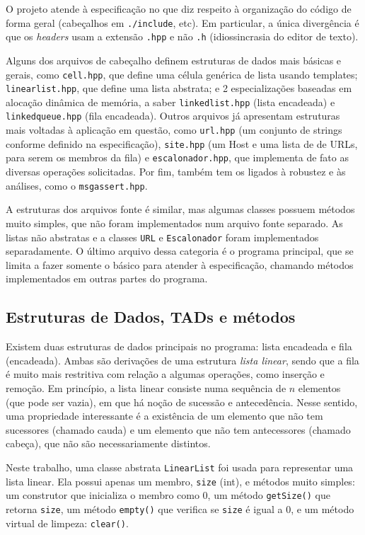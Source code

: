 \documentclass{article}
\def\code#1{\texttt{#1}}
\begin{document}
O projeto atende à especificação no que diz respeito à organização do código de forma geral (cabeçalhos em \code{./include}, etc). Em particular, a única divergência é que os \emph{headers} usam a extensão \code{.hpp} e não \code{.h} (idiossincrasia do editor de texto).

Alguns dos arquivos de cabeçalho definem estruturas de dados mais básicas e gerais, como \code{cell.hpp}, que define uma célula genérica de lista usando templates; \code{linearlist.hpp}, que define uma lista abstrata; e 2 especializações baseadas em alocação dinâmica de memória, a saber \code{linkedlist.hpp} (lista encadeada) e \code{linkedqueue.hpp} (fila encadeada). Outros arquivos já apresentam estruturas mais voltadas à aplicação em questão, como \code{url.hpp} (um conjunto de strings conforme definido na especificação), \code{site.hpp} (um Host e uma lista de de URLs, para serem os membros da fila) e \code{escalonador.hpp}, que implementa de fato as diversas operações solicitadas. Por fim, também tem os ligados à robustez e às análises, como o \code{msgassert.hpp}.

A estruturas dos arquivos fonte é similar, mas algumas classes possuem métodos muito simples, que não foram implementados num arquivo fonte separado. As listas não abstratas e a classes \code{URL}  e \code{Escalonador} foram implementados separadamente. O último arquivo dessa categoria é o programa principal, que se limita a fazer somente o básico para atender à especificação, chamando métodos implementados em outras partes do programa.

\subsection{Estruturas de Dados, TADs e métodos}

Existem duas estruturas de dados principais no programa: lista encadeada e fila (encadeada). Ambas são derivações de uma estrutura \textit{lista linear}, sendo que a fila é muito mais restritiva com relação a algumas operações, como inserção e remoção. Em princípio, a lista linear consiste numa sequência de \( n \) elementos (que pode ser vazia), em que há noção de sucessão e antecedência. Nesse sentido, uma propriedade interessante é a existência de um elemento que não tem sucessores (chamado cauda) e um elemento que não tem antecessores (chamado cabeça), que não são necessariamente distintos.

Neste trabalho, uma classe abstrata \code{LinearList} foi usada para representar uma lista linear. Ela possui apenas um membro, \code{size} (int), e métodos muito simples: um construtor que inicializa o membro como 0, um método \code{getSize()}  que retorna \code{size}, um método \code{empty()} que verifica se \code{size} é igual a 0, e um método virtual de limpeza: \code{clear()}.
\end{document}
